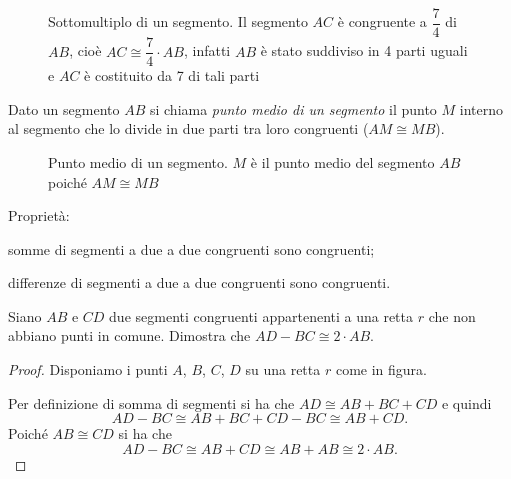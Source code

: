 \begin{inaccessibleblock}
 \begin{figure}[htb]
\centering
\caption{Sottomultiplo di un segmento. Il segmento $AC$ è congruente 
a $\dfrac{7}{4}$ di $AB$, cioè $AC\cong\dfrac{7}{4}\cdot AB$, infatti 
$AB$ è stato suddiviso in 4 parti uguali e $AC$ è costituito da 7 di 
tali parti}
\end{figure}
\end{inaccessibleblock}

\begin{definizione}
Dato un segmento $AB$ si chiama \emph{punto medio di un segmento} il 
punto $M$ interno al segmento che lo divide in due parti tra loro 
congruenti ($AM\cong MB$).
\end{definizione}


\begin{inaccessibleblock}
 \begin{figure}[htb]
\centering
\caption{Punto medio di un segmento. $M$ è il punto medio del 
segmento $AB$ poiché $AM\cong MB$}
\end{figure}
\end{inaccessibleblock}

Proprietà:
\begin{itemize*}
\item somme di segmenti a due a due congruenti sono congruenti; 
\item differenze di segmenti a due a due congruenti sono congruenti.
\end{itemize*}

\begin{exrig}
\begin{esempio}
Siano $AB$ e $CD$ due segmenti congruenti appartenenti a una retta 
$r$ che non abbiano punti in comune. Dimostra che $AD-BC\cong 2\cdot 
AB$.
\begin{proof}
Disponiamo i punti $A$, $B$, $C$, $D$ su una retta $r$ come in figura.

\begin{inaccessibleblock}
 \begin{figure}[htb]
\centering
\end{figure}
\end{inaccessibleblock}

Per definizione di somma di segmenti si ha che $AD\cong AB+BC+CD$ e 
quindi
\[AD-BC\cong AB+BC+CD-BC\cong AB+CD.\]
Poiché $AB\cong CD$ si ha che
\[AD-BC\cong AB+CD\cong AB+AB\cong 2\cdot AB.\]
\end{proof}
\end{esempio}
\end{exrig}

